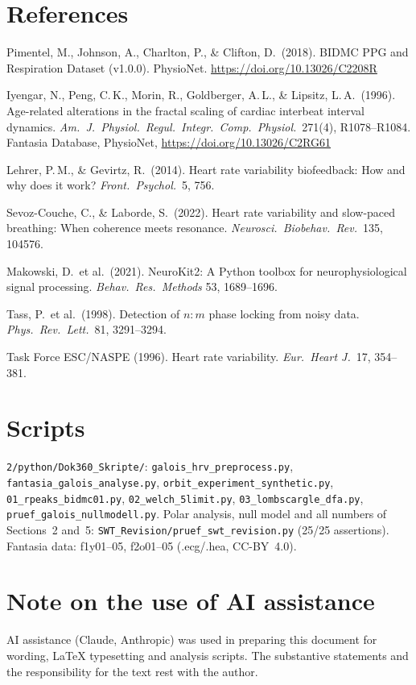 \section*{References}

\begin{description}[leftmargin=2em,labelwidth=1.8em]
\item[{[Pim18]}] Pimentel, M., Johnson, A., Charlton, P., \& Clifton, D.\ (2018).
  BIDMC PPG and Respiration Dataset (v1.0.0). PhysioNet.
  \url{https://doi.org/10.13026/C2208R}
\item[{[Iye96]}] Iyengar, N., Peng, C.\,K., Morin, R., Goldberger, A.\,L., \&
  Lipsitz, L.\,A.\ (1996). Age-related alterations in the fractal scaling of
  cardiac interbeat interval dynamics. \emph{Am.\ J.\ Physiol.\ Regul.\ Integr.\
  Comp.\ Physiol.}\ 271(4), R1078--R1084. Fantasia Database, PhysioNet,
  \url{https://doi.org/10.13026/C2RG61}
\item[{[Leh14]}] Lehrer, P.\,M., \& Gevirtz, R.\ (2014). Heart rate variability
  biofeedback: How and why does it work? \emph{Front.\ Psychol.}\ 5, 756.
\item[{[Sev22]}] Sevoz-Couche, C., \& Laborde, S.\ (2022). Heart rate
  variability and slow-paced breathing: When coherence meets resonance.
  \emph{Neurosci.\ Biobehav.\ Rev.}\ 135, 104576.
\item[{[Mak21]}] Makowski, D.\ et al.\ (2021). NeuroKit2: A Python toolbox for
  neurophysiological signal processing. \emph{Behav.\ Res.\ Methods} 53,
  1689--1696.
\item[{[Tas98]}] Tass, P.\ et al.\ (1998). Detection of $n{:}m$ phase locking
  from noisy data. \emph{Phys.\ Rev.\ Lett.}\ 81, 3291--3294.
\item[{[TF96]}] Task Force ESC/NASPE (1996). Heart rate variability.
  \emph{Eur.\ Heart J.}\ 17, 354--381.
\end{description}

\section*{Scripts}

\texttt{2/python/Dok360\_Skripte/}:
\texttt{galois\_hrv\_preprocess.py},
\texttt{fantasia\_galois\_analyse.py},
\texttt{orbit\_experiment\_synthetic.py},
\texttt{01\_rpeaks\_bidmc01.py},
\texttt{02\_welch\_5limit.py},
\texttt{03\_lombscargle\_dfa.py},
\texttt{pruef\_galois\_nullmodell.py}.
Polar analysis, null model and all numbers of Sections~2 and~5:
\texttt{SWT\_Revision/pruef\_swt\_revision.py} (25/25 assertions).
Fantasia data: f1y01--05, f2o01--05 (.ecg/.hea, CC-BY~4.0).

\section*{Note on the use of AI assistance}

AI assistance (Claude, Anthropic) was used in preparing this document
for wording, LaTeX typesetting and analysis scripts.
The substantive statements and the responsibility for the text
rest with the author.
